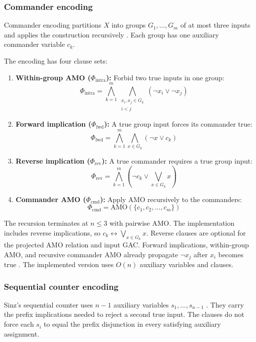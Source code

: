 \documentclass[a4paper,fleqn]{cas-sc}
\begin{document}
\subsubsection{Commander encoding}
Commander encoding partitions $X$ into groups $G_1,\dots,G_m$ of at most three inputs and applies the construction recursively \cite{klieber2007efficient}. Each group has one auxiliary commander variable $c_k$.

The encoding has four clause sets:
\begin{enumerate}
    \item \textbf{Within-group AMO ($\Phi_{\text{intra}}$):} Forbid two true inputs in one group:
    \begin{equation}
    \Phi_{\text{intra}} = \bigwedge_{k=1}^{m} \bigwedge_{\substack{x_i, x_j \in G_k \\ i < j}} (\neg x_i \vee \neg x_j)
    \end{equation}
    \item \textbf{Forward implication ($\Phi_{\text{fwd}}$):} A true group input forces its commander true:
    \begin{equation}
    \Phi_{\text{fwd}} = \bigwedge_{k=1}^{m} \bigwedge_{x \in G_k} (\neg x \vee c_k)
    \end{equation}
    \item \textbf{Reverse implication ($\Phi_{\text{rev}}$):} A true commander requires a true group input:
    \begin{equation}
    \Phi_{\text{rev}} = \bigwedge_{k=1}^{m} \left( \neg c_k \vee \bigvee_{x \in G_k} x \right)
    \end{equation}
    \item \textbf{Commander AMO ($\Phi_{\text{cmd}}$):} Apply AMO recursively to the commanders:
    \begin{equation}
    \Phi_{\text{cmd}} = \text{AMO}(\{c_1, c_2, \dots, c_m\})
    \end{equation}
\end{enumerate}
The recursion terminates at $n\leq3$ with pairwise AMO. The implementation includes reverse implications, so $c_k\leftrightarrow\bigvee_{x\in G_k}x$. Reverse clauses are optional for the projected AMO relation and input GAC. Forward implications, within-group AMO, and recursive commander AMO already propagate $\neg x_j$ after $x_i$ becomes true \cite{klieber2007efficient}. The implemented version uses $O(n)$ auxiliary variables and clauses.

\subsubsection{Sequential counter encoding}
Sinz's sequential counter uses $n-1$ auxiliary variables $s_1,\dots,s_{n-1}$ \cite{sinz2005towards}. They carry the prefix implications needed to reject a second true input. The clauses do not force each $s_i$ to equal the prefix disjunction in every satisfying auxiliary assignment.
\end{document}
